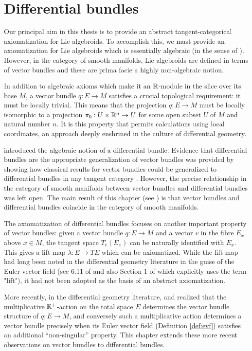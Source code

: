 \chapter{Differential bundles}%
\label{ch:differential_bundles}

Our principal aim in this thesis is to provide an abstract tangent-categorical axiomatization for Lie algebroids.  To accomplish this, we must provide an axiomatization for Lie algebroids which is essentially algebraic (in the sense of \cite{Freyd1972}).  However, in the category of smooth manifolds, Lie algebroids are defined in terms of vector bundles and these are prima facie a highly non-algebraic notion.  

In addition to algebraic axioms which make it an $\mathbb{R}$-module in the slice over its base $M$, a vector bundle $q:E \to M$ satisfies a crucial topological requirement:  it must be locally trivial.  This means that the projection $q : E \to M$ must be locally isomorphic to a projection $\pi_0:U \times \mathbb{R}^n \to U$ for some open subset $U$ of $M$ and natural number $n$.  It is this property that permits calculations using local coordinates, an approach deeply enshrined in the culture of differential geometry.

\cite{Cockett2017} introduced the algebraic notion of a differential bundle.  Evidence that differential bundles are the appropriate generalization of vector bundles was provided by showing how classical results for vector bundles could be generalized to differential bundles in any tangent category  \cite{Cockett2017,Cockett2018}.  However, the precise relationship in the category of smooth manifolds between vector bundles and differential bundles was left open. The main result of this chapter (see \cite{MacAdam2021}) is that vector bundles and differential bundles coincide in the category of smooth manifolds.

The axiomatization of differential bundles focuses on another important property of vector bundles: given a vector bundle $q:E \to M$ and a vector $v$ in the fibre $E_x$ above $x \in M$, the tangent space $T_v(E_x)$ can be naturally identified with $E_x$.    This gives a lift map $\lambda:E \to TE$ which can be axiomatized.   While the lift map had long been noted in the differential geometry literature in the guise of the Euler vector field (see 6.11 of \cite{Kolar1993} and also Section 1 of \cite{Michor1996} which explicitly uses the term "lift"), it had not been adopted as the basis of an abstract axiomatization.  

More recently, in the differential geometry literature, \cite{Grabowski2009} and \cite{Bursztyn2016} realized that the multiplicative $\mathbb{R}^+$-action on the total space $E$ determines the vector bundle structure of $q:E \to M$, and conversely such a multiplicative action determines a vector bundle precisely when its Euler vector field (Definition \ref{def:evf}) satisfies an additional ``non-singular'' property.  This chapter extends these more recent observations on vector bundles to differential bundles.

